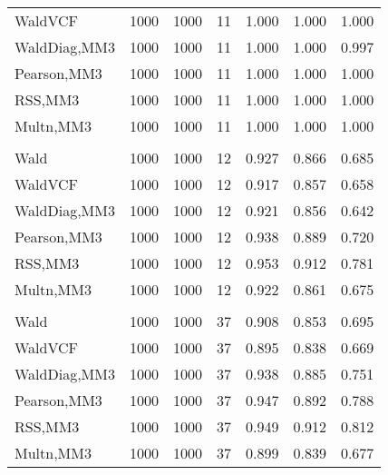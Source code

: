 \documentclass[
]{article}
\begin{document}
\begin{table}[H]
{\begin{tabular}[t]{lrrrrrr}
\hspace{1em}WaldVCF & 1000 & 1000 & 11 & 1.000 & 1.000 & 1.000\\
\hspace{1em}WaldDiag,MM3 & 1000 & 1000 & 11 & 1.000 & 1.000 & 0.997\\
\hspace{1em}Pearson,MM3 & 1000 & 1000 & 11 & 1.000 & 1.000 & 1.000\\
\hspace{1em}RSS,MM3 & 1000 & 1000 & 11 & 1.000 & 1.000 & 1.000\\
\hspace{1em}Multn,MM3 & 1000 & 1000 & 11 & 1.000 & 1.000 & 1.000\\
\addlinespace[0.3em]
\multicolumn{7}{l}{\textbf{2F 10V}}\\
\hspace{1em}Wald & 1000 & 1000 & 12 & 0.927 & 0.866 & 0.685\\
\hspace{1em}WaldVCF & 1000 & 1000 & 12 & 0.917 & 0.857 & 0.658\\
\hspace{1em}WaldDiag,MM3 & 1000 & 1000 & 12 & 0.921 & 0.856 & 0.642\\
\hspace{1em}Pearson,MM3 & 1000 & 1000 & 12 & 0.938 & 0.889 & 0.720\\
\hspace{1em}RSS,MM3 & 1000 & 1000 & 12 & 0.953 & 0.912 & 0.781\\
\hspace{1em}Multn,MM3 & 1000 & 1000 & 12 & 0.922 & 0.861 & 0.675\\
\addlinespace[0.3em]
\multicolumn{7}{l}{\textbf{3F 15V}}\\
\hspace{1em}Wald & 1000 & 1000 & 37 & 0.908 & 0.853 & 0.695\\
\hspace{1em}WaldVCF & 1000 & 1000 & 37 & 0.895 & 0.838 & 0.669\\
\hspace{1em}WaldDiag,MM3 & 1000 & 1000 & 37 & 0.938 & 0.885 & 0.751\\
\hspace{1em}Pearson,MM3 & 1000 & 1000 & 37 & 0.947 & 0.892 & 0.788\\
\hspace{1em}RSS,MM3 & 1000 & 1000 & 37 & 0.949 & 0.912 & 0.812\\
\hspace{1em}Multn,MM3 & 1000 & 1000 & 37 & 0.899 & 0.839 & 0.677\\
\bottomrule
\end{tabular}}
\endgroup{}
\end{table}
\end{document}
